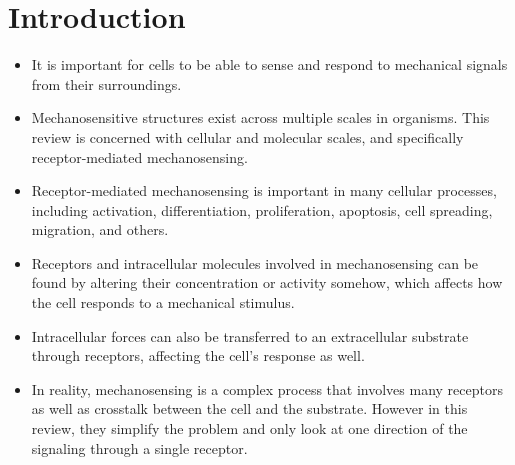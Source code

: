 \documentclass[
10pt, %
letterpaper, %
twocolumn, %
landscape %
]{article}
\begin{document}
\pagestyle{myheadings} %
\markright{\doctitle} %


\thispagestyle{plain} %

\printtitle %


\section{Introduction}
\label{sec:introduction}

\begin{itemize}
\item It is important for cells to be able to sense and respond to
  mechanical signals from their surroundings. 
\item Mechanosensitive structures exist across multiple scales in
  organisms. This review is concerned with cellular and molecular
  scales, and specifically receptor-mediated mechanosensing.
\item Receptor-mediated mechanosensing is important in many cellular
  processes, including activation, differentiation, proliferation,
  apoptosis, cell spreading, migration, and others.
\item Receptors and intracellular molecules involved in mechanosensing
  can be found by altering their concentration or activity somehow,
  which affects how the cell responds to a mechanical stimulus.
\item Intracellular forces can also be transferred to an extracellular
  substrate through receptors, affecting the cell's response as well.
\item In reality, mechanosensing is a complex process that involves
  many receptors as well as crosstalk between the cell and the
  substrate. However in this review, they simplify the problem and
  only look at one direction of the signaling through a single
  receptor.
\end{itemize}

\end{document}
